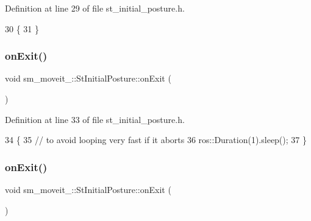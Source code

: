 Definition at line 29 of file st\+\_\+initial\+\_\+posture.\+h.


\begin{DoxyCode}
30     \{
31     \}
\end{DoxyCode}
\mbox{\label{structsm__moveit__4_1_1StInitialPosture_a2773a03a41fa526fc3be1371245886a5}} 
\subsubsection{\texorpdfstring{on\+Exit()}{onExit()}\hspace{0.1cm}{\footnotesize\ttfamily [2/3]}}
{\footnotesize\ttfamily void sm\+\_\+moveit\+\_\+::\+St\+Initial\+Posture\+::on\+Exit (\begin{DoxyParamCaption}\item[{\hyperlink{structsmacc_1_1default__transition__tags_1_1ABORT}{A\+B\+O\+RT}}]{ }\end{DoxyParamCaption})\hspace{0.3cm}{\ttfamily [inline]}}



Definition at line 33 of file st\+\_\+initial\+\_\+posture.\+h.


\begin{DoxyCode}
34     \{
35         \textcolor{comment}{// to avoid looping very fast if it aborts}
36         ros::Duration(1).sleep();
37     \}
\end{DoxyCode}
\mbox{\label{structsm__moveit__4_1_1StInitialPosture_a13d072d68463d6aeafb5e07dbec2aaa2}} 
\subsubsection{\texorpdfstring{on\+Exit()}{onExit()}\hspace{0.1cm}{\footnotesize\ttfamily [3/3]}}
{\footnotesize\ttfamily void sm\+\_\+moveit\+\_\+::\+St\+Initial\+Posture\+::on\+Exit (\begin{DoxyParamCaption}{ }\end{DoxyParamCaption})\hspace{0.3cm}{\ttfamily [inline]}}



